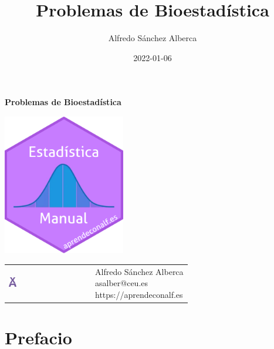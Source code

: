 \documentclass[
  a4paper,
]{scrreport}
\title{Problemas de Bioestadística}
\author{Alfredo Sánchez Alberca}
\date{2022-01-06}
\renewcommand*\contentsname{Tabla de contenidos}
\newcommand\contentsname{Tabla de contenidos}
\theoremstyle{definition}
\theoremstyle{remark}
\begin{document}
\begin{titlepage}

\begin{center}
\vspace*{5cm}

\Huge
{\textbf{\textsf{Problemas de Bioestadística}}}

\vspace{0.5cm}
\LARGE
{\textbf{\textsf{}}}

\vspace{1.5cm}

\includegraphics[width=0.4\textwidth]{img/logos/sticker.png}
\end{center}

\vfill

\begin{flushleft}
\begin{tabular}{ll}
\includegraphics[width=0.1\textwidth]{img/logos/aprendeconalf.png} & \parbox[b]{5cm}{\Large\textsf{Alfredo
Sánchez
Alberca}\\ \textsf{asalber@ceu.es} \\ \textsf{https://aprendeconalf.es}}
\end{tabular}
\end{flushleft}
\end{titlepage}
\renewcommand*\contentsname{Tabla de contenidos}
{
\hypersetup{linkcolor=}
\setcounter{tocdepth}{2}
\tableofcontents
}

\chapter*{Prefacio}\label{prefacio}
\end{document}
